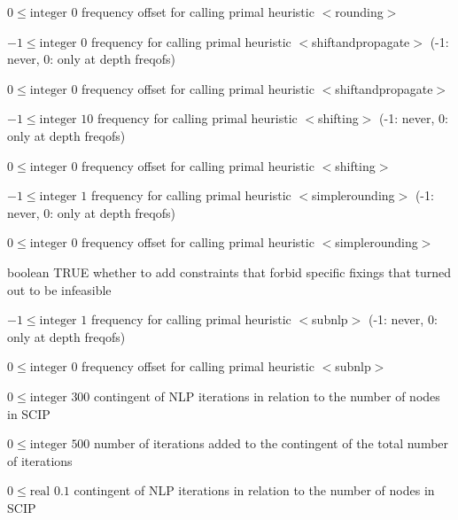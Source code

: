 %
{$0\leq\textrm{integer}$}%
{$0$}%
{frequency offset for calling primal heuristic $<$rounding$>$}%
{}

%
{$-1\leq\textrm{integer}$}%
{$0$}%
{frequency for calling primal heuristic $<$shiftandpropagate$>$ (-1: never, 0: only at depth freqofs)}%
{}

%
{$0\leq\textrm{integer}$}%
{$0$}%
{frequency offset for calling primal heuristic $<$shiftandpropagate$>$}%
{}

%
{$-1\leq\textrm{integer}$}%
{$10$}%
{frequency for calling primal heuristic $<$shifting$>$ (-1: never, 0: only at depth freqofs)}%
{}

%
{$0\leq\textrm{integer}$}%
{$0$}%
{frequency offset for calling primal heuristic $<$shifting$>$}%
{}

%
{$-1\leq\textrm{integer}$}%
{$1$}%
{frequency for calling primal heuristic $<$simplerounding$>$ (-1: never, 0: only at depth freqofs)}%
{}

%
{$0\leq\textrm{integer}$}%
{$0$}%
{frequency offset for calling primal heuristic $<$simplerounding$>$}%
{}

%
{boolean}%
{TRUE}%
{whether to add constraints that forbid specific fixings that turned out to be infeasible}%
{}

%
{$-1\leq\textrm{integer}$}%
{$1$}%
{frequency for calling primal heuristic $<$subnlp$>$ (-1: never, 0: only at depth freqofs)}%
{}

%
{$0\leq\textrm{integer}$}%
{$0$}%
{frequency offset for calling primal heuristic $<$subnlp$>$}%
{}

%
{$0\leq\textrm{integer}$}%
{$300$}%
{contingent of NLP iterations in relation to the number of nodes in SCIP}%
{}

%
{$0\leq\textrm{integer}$}%
{$500$}%
{number of iterations added to the contingent of the total number of iterations}%
{}

%
{$0\leq\textrm{real}$}%
{$0.1$}%
{contingent of NLP iterations in relation to the number of nodes in SCIP}%
{}

